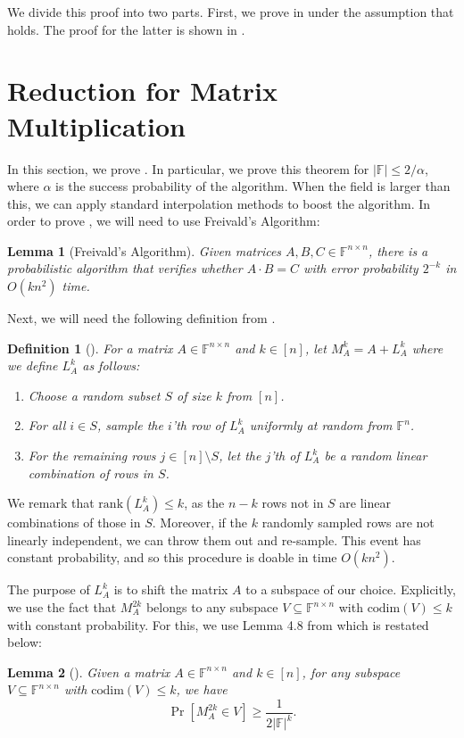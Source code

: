 \documentclass[12pt]{caltech_thesis}
\def\F{\mathbb{F}}
\newcommand{\rank}{\text{rank}}
\newcommand{\codim}{\text{codim}}
\newtheorem{lemma}{Lemma}
\newtheorem{definition}{Definition}
\begin{document}
We divide this proof into two parts.
First, we prove   in  under the assumption that  holds.
The proof for the latter is shown in .



\section{Reduction for Matrix Multiplication}
\label{sec:proof-reduction}
In this section, we prove . In particular, we prove this theorem for $|\F| \leq 2/\alpha$, where $\alpha$ is the success probability of the algorithm. When the field is larger than this, we can apply standard interpolation methods to boost the algorithm. In order to prove , we will need to use Freivald's Algorithm:
\begin{lemma}[Freivald's Algorithm]
\label{lem:freivald}
    Given matrices $A, B, C \in \F^{n\times n}$, there is a probabilistic algorithm that verifies whether $A\cdot B = C$ with error probability $2^{-k}$ in $O(kn^2)$ time.
\end{lemma}

Next, we will need the following definition from \cite{asadi2022worstcase}.

\begin{definition}[\cite{asadi2022worstcase}]
\label{def:mka}
    For a matrix $A \in \F^{n\times n}$ and $k \in [n]$, let $M^k_A = A + L^k_A$ where we define $L^k_A$ as follows:
    \begin{enumerate}
        \item Choose a random subset $S$ of size $k$ from $[n]$.
        \item For all $i \in S$, sample the $i$'th row of 
        $L^k_A$ uniformly at random from $\F^n$.
        \item For the remaining rows $j \in [n]\setminus S$, let
        the $j$'th of $L^k_A$ be a random linear combination of
        rows in $S$.
    \end{enumerate}
\end{definition}
We remark that $\rank(L^k_A) \leq k$, as the $n-k$ rows not in 
$S$ are linear combinations of those in $S$. Moreover, if the 
$k$ randomly sampled rows are not linearly independent, we can 
throw them out and re-sample. This event has constant 
probability, and so this procedure is doable in time $O(kn^2)$.

The purpose of $L^k_A$ is to shift the matrix $A$ to a subspace of our choice. Explicitly, we use the fact that $M^{2k}_A$ belongs to any subspace 
$V \subseteq \F^{n\times n}$ with $\codim(V) \leq k$ with 
constant probability. For this, we use Lemma 4.8 from
\cite{asadi2022worstcase} which is restated below:
\begin{lemma}[\cite{asadi2022worstcase}]
\label{lem:m2ka}
    Given a matrix $A \in \F^{n\times n}$ and $k \in [n]$, for any subspace $V \subseteq \F^{n \times n}$ with $\codim(V) \leq k$, we have
    \begin{equation}
        \Pr[M^{2k}_A \in V] \geq \frac{1}{2|\F|^k}.
    \end{equation}
\end{lemma}
\end{document}
